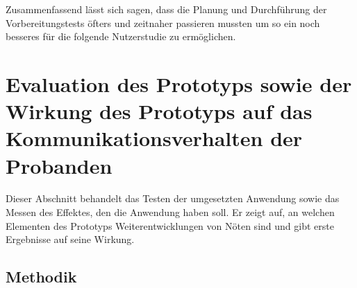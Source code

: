 Zusammenfassend lässt sich sagen, dass die Planung und Durchführung der Vorbereitungstests öfters und zeitnaher passieren mussten um so ein noch besseres für die folgende Nutzerstudie zu ermöglichen.

\chapter{Evaluation des Prototyps sowie der Wirkung des Prototyps auf das Kommunikationsverhalten der Probanden} \label{sec:study}

Dieser Abschnitt behandelt das Testen der umgesetzten Anwendung sowie das Messen des Effektes, den die Anwendung haben soll. Er zeigt auf, an welchen Elementen des Prototyps Weiterentwicklungen von Nöten sind und gibt erste Ergebnisse auf seine Wirkung. 





\section{Methodik}



